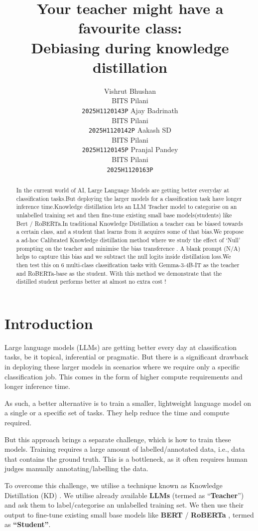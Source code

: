 \documentclass[11pt]{article}
\title{Your teacher might have a favourite class:\\Debiasing during knowledge distillation}
\author{
  Vishrut Bhushan \\
  BITS Pilani \\
  \texttt{2025H1120143P} \And
  Ajay Badrinath \\
  BITS Pilani \\
  \texttt{2025H1120142P} \And
  Aakash SD \\
  BITS Pilani \\
  \texttt{2025H1120145P} \And
  Pranjal Pandey \\
  BITS Pilani \\
  \texttt{2025H1120163P}
}
\begin{document}
\maketitle

\begin{abstract}
In the current world of AI, Large Language Models are getting better everyday at classification tasks.But deploying the larger models for a classification task have longer inference time.Knowledge distillation lets an LLM Teacher model to categorise on an unlabelled training set and then fine-tune  existing small base models(students) like Bert / RoBERTa.In traditional Knowledge Distillation  a teacher can be biased towards a certain class, and a student that learns from it acquires some of that bias.We propose a ad-hoc Calibrated Knowledge distillation method where we study the effect of ‘Null’ prompting on the teacher and minimise the bias transference . A blank prompt (N/A) helps to capture this bias and we subtract the null logits inside distillation loss.We then test this on 6 multi-class classification tasks with Gemma-3-4B-IT as the teacher and RoBERTa-base as the student. With this method we demonstrate that the distilled student performs better at almost no extra cost !
\end{abstract}

\section{Introduction}

Large language models (LLMs) are getting better every day at classification tasks, be it topical, inferential or pragmatic.
But there is a significant drawback in deploying these larger models in scenarios where we require only a specific classification job.
This comes in the form of higher compute requirements and longer inference time.

As such, a better alternative is to train a smaller, lightweight language model on a single or a specific set of tasks.
They help reduce the time and compute required.

But this approach brings a separate challenge, which is how to train these models.
Training requires a large amount of labelled/annotated data, i.e., data that contains the ground truth.
This is a bottleneck, as it often requires human judges manually annotating/labelling the data.

To overcome this challenge, we utilise a technique known as Knowledge Distillation (KD) \citep{hinton2015distilling}.
We utilise already available \textbf{LLMs} (termed as ``\textbf{Teacher}'') and ask them to label/categorise an unlabelled training set.
We then use their output to fine-tune existing small base models like \textbf{BERT} \citep{devlin2019bert} / \textbf{RoBERTa} \citep{liu2019roberta}, termed as \textbf{``Student''}.
\end{document}
